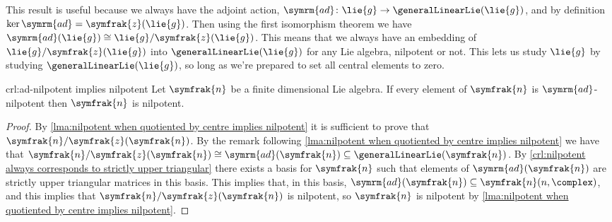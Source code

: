 \documentclass[fleqn]{NotesClass}
\newcommand{\isomorphic}{\cong}
\newcommand{\ad}{\symrm{ad}}
\newcommand{\nilpotentLie}{\symfrak{n}}
\newcommand{\centre}{\symfrak{z}}
\begin{document}
    This result is useful because we always have the adjoint action, \(\ad \colon \lie{g} \to \generalLinearLie(\lie{g})\), and by definition \(\ker \ad = \centre(\lie{g})\).
    Then using the first isomorphism theorem we have \(\ad(\lie{g}) \isomorphic \lie{g} / \centre(\lie{g})\).
    This means that we always have an embedding of \(\lie{g}/\centre(\lie{g})\) into \(\generalLinearLie(\lie{g})\) for any Lie algebra, nilpotent or not.
    This lets us study \(\lie{g}\) by studying \(\generalLinearLie(\lie{g})\), so long as we're prepared to set all central elements to zero.
    
    \begin{crl}{}{crl:ad-nilpotent implies nilpotent}
        Let \(\nilpotentLie\) be a finite dimensional Lie algebra.
        If every element of \(\nilpotentLie\) is \(\ad\)-nilpotent then \(\nilpotentLie\) is nilpotent.
        \begin{proof}
            By \cref{lma:nilpotent when quotiented by centre implies nilpotent} it is sufficient to prove that \(\nilpotentLie/\centre(\nilpotentLie)\).
            By the remark following \cref{lma:nilpotent when quotiented by centre implies nilpotent} we have that \(\nilpotentLie/\centre(\nilpotentLie) \isomorphic \ad(\nilpotentLie) \subseteq \generalLinearLie(\nilpotentLie)\).
            By \cref{crl:nilpotent always corresponds to strictly upper triangular} there exists a basis for \(\nilpotentLie\) such that elements of \(\ad(\nilpotentLie)\) are strictly upper triangular matrices in this basis.
            This implies that, in this basis, \(\ad(\nilpotentLie) \subseteq \nilpotentLie(n, \complex)\), and this implies that \(\nilpotentLie/\centre(\nilpotentLie)\) is nilpotent, so \(\nilpotentLie\) is nilpotent by \cref{lma:nilpotent when quotiented by centre implies nilpotent}.
        \end{proof}
    \end{crl}
    
\end{document}
